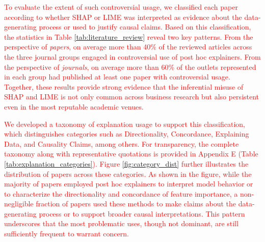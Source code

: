 \documentclass[mnsc,blindrev]{informs3}
\begin{document}
\textcolor{red}{To evaluate the extent of such controversial usage, we classified each paper according to whether SHAP or LIME was interpreted as evidence about the data-generating process or used to justify causal claims. Based on this classification, the statistics in Table \ref{tab:literature_review} reveal two key patterns. From the perspective of \textit{papers}, on average more than 40\% of the reviewed articles across the three journal groups engaged in controversial use of post hoc explainers. From the perspective of \textit{journals}, on average more than 60\% of the outlets represented in each group had published at least one paper with controversial usage. Together, these results provide strong evidence that the inferential misuse of SHAP and LIME is not only common across business research but also persistent even in the most reputable academic venues. }



\textcolor{red}{We developed a taxonomy of explanation usage to support this classification, which distinguishes categories such as Directionality, Concordance, Explaining Data, and Causality Claims, among others. For transparency, the complete taxonomy along with representative quotations is provided in Appendix E (Table \ref{tab:explanation_categories}). Figure \ref{fig:category_dist} further illustrates the distribution of papers across these categories. As shown in the figure, while the majority of papers employed post hoc explainers to interpret model behavior or to characterize the directionality and concordance of feature importance, a non-negligible fraction of papers used these methods to make claims about the data-generating process or to support broader causal interpretations. This pattern underscores that the most problematic uses, though not dominant, are still sufficiently frequent to warrant concern.}
\end{document}

